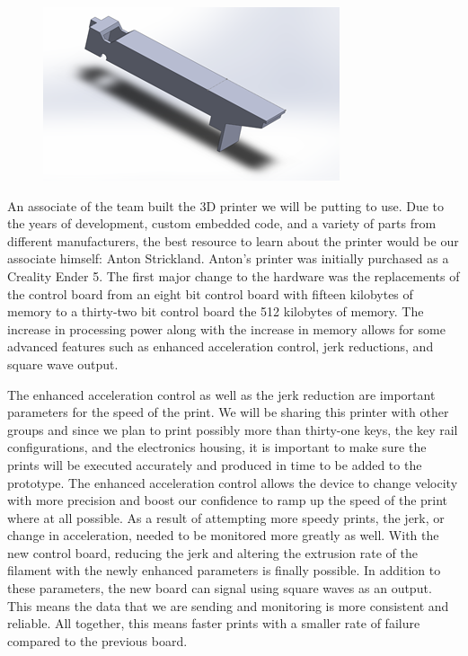 \begin{figure}[h!]
  \centering
  \includegraphics[width=0.7\linewidth]{image/WhiteModel1.png}
  \caption{}
  \label{fig:white_model1}
\end{figure}

An associate of the team built the 3D printer we will be putting to use. Due to the years of development, custom embedded code, and a variety of parts from different manufacturers, the best resource to learn about the printer would be our associate himself: Anton Strickland. Anton’s printer was initially purchased as a Creality Ender 5. The first major change to the hardware was the replacements of the control board from an eight bit control board with fifteen kilobytes of memory to a thirty-two bit control board the 512 kilobytes of memory. The increase in processing power along with the increase in memory allows for some advanced features such as enhanced acceleration control, jerk reductions, and square wave output.

The enhanced acceleration control as well as the jerk reduction are important parameters for the speed of the print. We will be sharing this printer with other groups and since we plan to print possibly more than thirty-one keys, the key rail configurations, and the electronics housing, it is important to make sure the prints will be executed accurately and produced in time to be added to the prototype. The enhanced acceleration control allows the device to change velocity with more precision and boost our confidence to ramp up the speed of the print where at all possible. As a result of attempting more speedy prints, the jerk, or change in acceleration, needed to be monitored more greatly as well. With the new control board, reducing the jerk and altering the extrusion rate of the filament with the newly enhanced parameters is finally possible. In addition to these parameters, the new board can signal using square waves as an output. This means the data that we are sending and monitoring is more consistent and reliable. All together, this means faster prints with a smaller rate of failure compared to the previous board.

